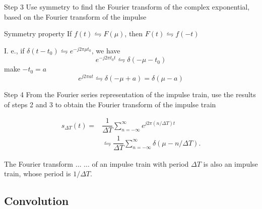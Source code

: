 
\begin{frame}
\begin{block}{Step 3}
Use symmetry to find the Fourier transform of the complex exponential, based on the Fourier transform of the impulse
\end{block}
\begin{block}{Symmetry property}
If $f(t)\leftrightharpoons F(\mu)$, then $F(t) \leftrightharpoons f(-t)$
\end{block}
I. e., if $\delta(t-t_{0}) \leftrightharpoons e^{-j2\pi \mu t_{0}}$, we have
\[
e^{-j2\pi t_{0} t} \leftrightharpoons \delta(-\mu-t_{0})
\]
make $-t_{0} = a$
\[
\boxed{
e^{j2\pi at} \leftrightharpoons \delta(-\mu+a) = \delta(\mu-a)
}
\]
\end{frame}


\begin{frame}
\begin{block}{Step 4}
From the Fourier series representation of the impulse train, use the results of steps 2 and 3 to obtain the Fourier transform of the impulse train
\end{block}
\begin{equation}
\begin{split}
s_{\Delta T}(t) = & \dfrac{1}{\Delta T}
\sum_{n=-\infty}^{\infty}
e^{j2\pi(n/\Delta T)t} \\
& \leftrightharpoons \dfrac{1}{\Delta T} \sum_{n=-\infty}^{\infty} \delta(\mu - n/\Delta T).
\end{split}
\end{equation}
\begin{block}{The Fourier transform $\ldots$}
$\ldots$ of an impulse train with period $\Delta T$ is also an impulse train, whose period is $1/\Delta T$.
\end{block}
\end{frame}


\subsection{Convolution}


